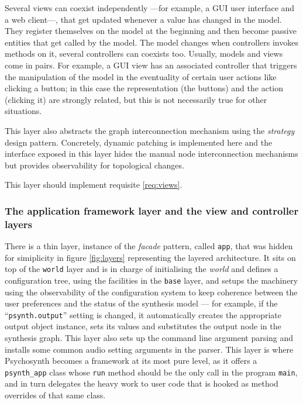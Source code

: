 Several views can coexist independently ---for example, a GUI user
interface and a web client---, that get updated whenever a value has
changed in the model. They register themselves on the model at the
beginning and then become passive entities that get called by the
model. The model changes when controllers invokes methods on it,
several controllers can coexists too. Usually, models and views come
in pairs. For example, a GUI view has an associated controller that
triggers the manipulation of the model in the eventuality of certain
user actions like clicking a button; in this case the representation
(the buttons) and the action (clicking it) are strongly related, but
this is not necessarily true for other situations.

This layer also abstracts the graph interconnection mechanism using
the \emph{strategy} design pattern. Concretely, dynamic patching is
implemented here and the interface exposed in this layer hides the
manual node interconnection mechanisms but provides observability for
topological changes.

This layer should implement requisite \ref{req:views}. 

\subsubsection{The application framework layer and the view and
  controller layers}

There is a thin layer, instance of the \emph{facade} pattern, called
\texttt{app}, that was hidden for simiplicity in figure
\ref{fig:layers} representing the layered architecture. It sits on top
of the \texttt{world} layer and is in charge of initialising the
\emph{world} and defines a configuration tree, using the facilities in
the \texttt{base} layer, and setups the machinery using the
observability of the configuration system to keep coherence between
the user preferences and the status of the synthesis model --- for
example, if the ``\texttt{psynth.output}'' setting is changed, it
automatically creates the appropriate output object instance, sets its
values and substitutes the output node in the synthesis graph. This
layer also sets up the command line argument parsing and installs some
common audio setting arguments in the parser. This layer is where
Psychosynth becomes a framework at its most pure level, as it offers a
\texttt{psynth\_app} class whose \texttt{run} method
should be the only call in the program \texttt{main}, and in turn
delegates the heavy work to user code that is hooked as method
overrides of that same class.


